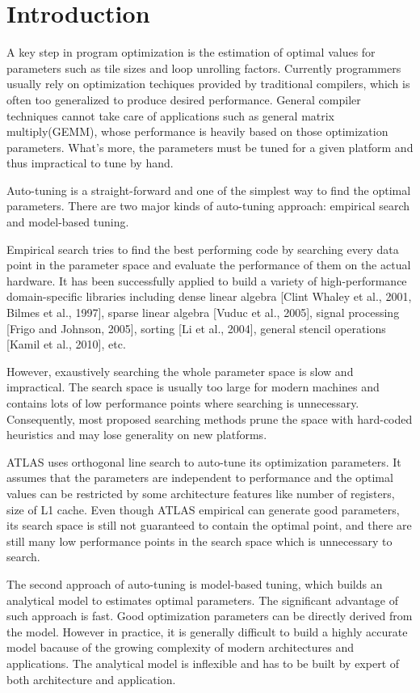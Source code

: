 \section{Introduction}
\label{sec:intro}

A key step in program optimization is the estimation of optimal values for
parameters such as tile sizes and loop unrolling factors. 
Currently programmers usually rely on optimization techiques provided by traditional compilers, which
is often too generalized to produce desired performance. 
General compiler techniques cannot take care of applications such as general matrix multiply(GEMM), 
whose performance is heavily based on those optimization parameters. 
What's more, the parameters must be tuned for a given platform and thus impractical to tune by hand.


\par

Auto-tuning is a straight-forward and one of the simplest way to find the optimal parameters.
There are two major kinds of auto-tuning approach: empirical search and model-based tuning. 
\par
Empirical search tries to find the best performing code by searching every data point in 
the parameter space and evaluate the performance of them on the actual hardware.
It has been successfully applied to build a variety
of high-performance domain-specific libraries including
dense linear algebra [Clint Whaley et al., 2001, Bilmes et al.,
1997], sparse linear algebra [Vuduc et al., 2005], signal processing
[Frigo and Johnson, 2005], sorting [Li et al., 2004],
general stencil operations [Kamil et al., 2010], etc.
\par
However, exaustively searching the whole parameter space is slow and impractical. 
The search space is usually too large for modern machines and contains lots of low performance points where
searching is unnecessary. Consequently, most proposed searching methods
prune the space with hard-coded heuristics and may lose generality on new platforms.
\par
ATLAS uses orthogonal line search to auto-tune its optimization parameters. 
It assumes that the parameters are independent to performance and the optimal values can be 
restricted by some architecture features like number of registers, size of L1 cache. 
Even though ATLAS empirical can generate good parameters, its search space is still not guaranteed to contain 
the optimal point, and there are still many low performance points in the search space which is unnecessary 
to search.
\par
The second approach of auto-tuning is model-based tuning, which builds an analytical model
to estimates optimal parameters. The significant advantage of such approach is fast. Good optimization
parameters can be directly derived from the model. 
However in practice, it is generally difficult to build a highly accurate model bacause of the growing complexity
of modern architectures and applications. The analytical model is inflexible and has to be built by expert of both architecture
and application.

